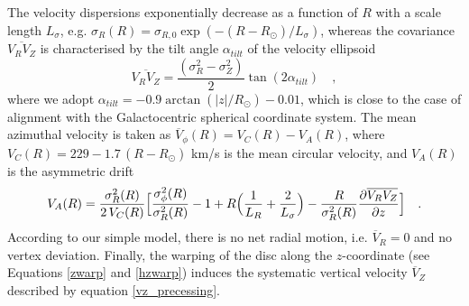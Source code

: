 \documentclass{nature}
\begin{document}
\begin{methods}
The velocity dispersions exponentially decrease as a function of $R$ with a scale length $L_{\sigma}$, e.g. $\sigma_{R}(R)=\sigma_{R,0}\exp{(-(R - R_{\odot})/L_\sigma)}$, whereas the covariance $\overline{V_R V_Z}$ is characterised by the tilt angle $\alpha_{tilt}$ of the velocity ellipsoid 
\begin {equation}
\label{alpha_tilt} 
\overline{V_R V_Z} =\frac{(\sigma^2_R - \sigma^2_Z)}{2} \tan(2 \alpha_{tilt})\quad,
\end{equation}
where we adopt $\alpha_{tilt} = -0.9 \arctan(|z|/ R_{\odot}) - 0.01$\cite{Buedenbender:2015}, which is close to the case of alignment with the Galactocentric spherical coordinate
system. The mean azimuthal velocity is taken as $\overline{V}_{\phi}(R)=V_C(R) - V_A(R)$, where $V_C (R) = 229 - 1.7\, (R - R_{\odot})$ km/s\cite{Eilers:2019} is the mean circular velocity, and $V_A(R)$ is the asymmetric drift\cite{Binney:2008}
\begin {equation}
\label{asymm_drift} 
V_A(R)=  \frac{\sigma^2_R(R)}{2 \, V_C(R)} \Bigl[  \frac{\sigma^2_{\phi}(R)}{\sigma^2_R(R)} - 1 + R \Bigl( \frac{1}{L_R} + \frac{2}{L_{\sigma}} \Bigr) - \frac{R}{\sigma^2_R(R)} \frac {\partial \overline{V_R V_Z}}{\partial z}\Bigr] \quad.
\end{equation}
According to our simple model, there is no net radial motion, i.e. $\overline{V}_R=0$ and no vertex deviation. Finally, the warping of the disc along the $z$-coordinate (see Equations \ref{zwarp} and \ref{hzwarp}) induces the systematic vertical velocity $\overline{V}_Z$ described by equation \ref{vz_precessing}.

\end{methods}
\end{document}
